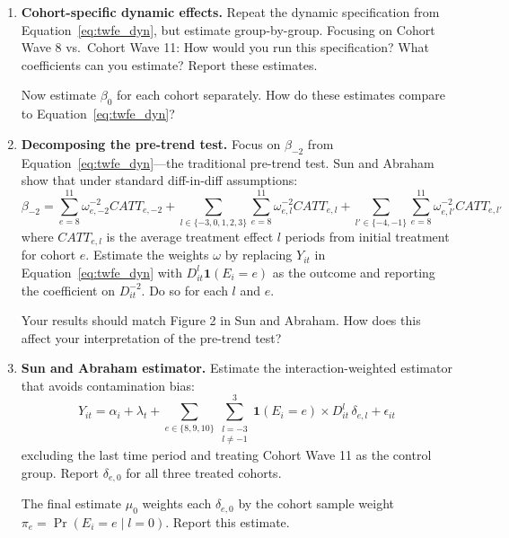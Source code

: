 \documentclass[11pt]{article}
\begin{document}
\begin{enumerate}[resume]

    \item \textbf{Cohort-specific dynamic effects.} Repeat the dynamic specification from Equation~\ref{eq:twfe_dyn}, but estimate group-by-group. Focusing on Cohort Wave 8 vs.\ Cohort Wave 11: How would you run this specification? What coefficients can you estimate? Report these estimates.

    Now estimate $\beta_0$ for each cohort separately. How do these estimates compare to Equation~\ref{eq:twfe_dyn}?


    \item \textbf{Decomposing the pre-trend test.} Focus on $\beta_{-2}$ from Equation~\ref{eq:twfe_dyn}---the traditional pre-trend test. Sun and Abraham show that under standard diff-in-diff assumptions:
    \begin{equation}
        \beta_{-2} = \sum_{e=8}^{11} \omega_{e,-2}^{-2} CATT_{e,-2} + \sum_{l \in \{-3,0,1,2,3\}} \sum_{e=8}^{11} \omega_{e,l}^{-2} CATT_{e,l} + \sum_{l' \in \{-4,-1\}} \sum_{e=8}^{11} \omega_{e,l'}^{-2} CATT_{e,l'}
    \end{equation}
    where $CATT_{e,l}$ is the average treatment effect $l$ periods from initial treatment for cohort $e$. Estimate the weights $\omega$ by replacing $Y_{it}$ in Equation~\ref{eq:twfe_dyn} with $D_{it}^l \mathbf{1}(E_i = e)$ as the outcome and reporting the coefficient on $D_{it}^{-2}$. Do so for each $l$ and $e$.

    Your results should match Figure 2 in Sun and Abraham. How does this affect your interpretation of the pre-trend test?

    \item \textbf{Sun and Abraham estimator.} Estimate the interaction-weighted estimator that avoids contamination bias:
    \begin{equation}
        Y_{it} = \alpha_i + \lambda_t + \sum_{e \in \{8,9,10\}} \sum_{\substack{l = -3 \\ l \neq -1}}^{3} \mathbf{1}(E_i = e) \times D_{it}^l \, \delta_{e,l} + \epsilon_{it}
    \end{equation}
    excluding the last time period and treating Cohort Wave 11 as the control group. Report $\delta_{e,0}$ for all three treated cohorts.

    The final estimate $\mu_0$ weights each $\delta_{e,0}$ by the cohort sample weight $\pi_e = \Pr(E_i = e \mid l = 0)$. Report this estimate.


\end{enumerate}
\end{document}
